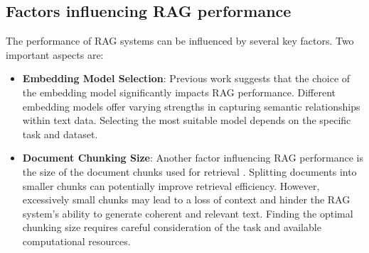 \subsection{Factors influencing \ac{RAG} performance}
The performance of \ac{RAG} systems can be influenced by several key factors.
Two important aspects are:

\begin{itemize}
  \item \textbf{Embedding Model Selection}:
    Previous work \cite{joshi2024RAGemb} suggests that the choice of the embedding model significantly impacts \ac{RAG} performance.
    Different embedding models offer varying strengths in capturing semantic relationships within text data.
    Selecting the most suitable model depends on the specific task and dataset.
  \item \textbf{Document Chunking Size}:
    Another factor influencing \ac{RAG} performance is the size of the document chunks used for retrieval \cite{theja2023RAGchunk}.
    Splitting documents into smaller chunks can potentially improve retrieval efficiency.
    However, excessively small chunks may lead to a loss of context and hinder the \ac{RAG} system's ability to generate coherent and relevant text.
    Finding the optimal chunking size requires careful consideration of the task and available computational resources.    
\end{itemize}




